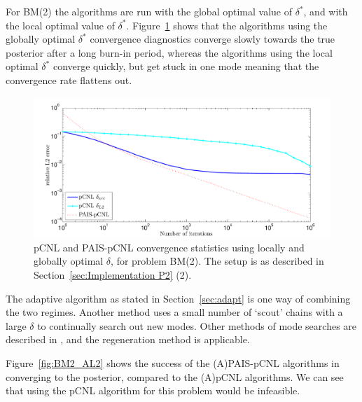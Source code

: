 \documentclass[final]{siamltex}
\begin{document}
For BM(2) the algorithms are run with the global optimal value of $\delta^*$, and with the local optimal value of $\delta^*$. Figure~\ref{fig:BM2_L2} shows that the algorithms using the globally optimal $\delta^*$ convergence diagnostics converge slowly towards the true posterior after a long burn-in period, whereas the algorithms using the local optimal $\delta^*$ converge quickly, but get stuck in one mode meaning that the convergence rate flattens out.

\begin{figure}[h]
\begin{center}
\includegraphics[width=\textwidth]{"figures/BM2_L2"}
\caption{pCNL and PAIS-pCNL convergence statistics using locally and
  globally optimal $\delta$, for problem BM(2). The setup is as described in Section~\ref{sec:Implementation P2} (2).}
\label{fig:BM2_L2}
\end{center}
\end{figure}

The adaptive algorithm as stated in Section~\ref{sec:adapt} is one way of combining the two regimes. Another method uses a small number of `scout' chains with a large $\delta$ to continually search out new modes. Other methods of mode searches are described in \cite{lan2013wormhole}, and the regeneration method is applicable\cite{nummelin1984general}.

Figure~\ref{fig:BM2_AL2} shows the success of the (A)PAIS-pCNL algorithms in converging to the posterior, compared to the (A)pCNL algorithms. We can see that using the pCNL algorithm for this problem would be infeasible.
\end{document}
